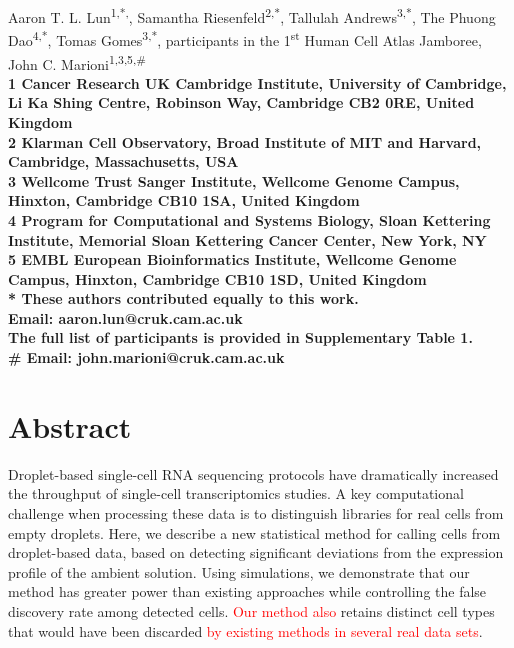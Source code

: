 \documentclass[10pt,letterpaper]{article}
\newcommand{\revised}[1]{\textcolor{red}{#1}}
\begin{document}
\vspace*{0.35in}

\begin{flushleft}
{\Large
    \textbf{}
}
\newline

Aaron T. L. Lun\textsuperscript{1,*,\dag{}},
Samantha Riesenfeld\textsuperscript{2,*},
Tallulah Andrews\textsuperscript{3,*},
The Phuong Dao\textsuperscript{4,*},
Tomas Gomes\textsuperscript{3,*},
participants in the 1\textsuperscript{st} Human Cell Atlas Jamboree\textsuperscript{\ddag{}},
John C. Marioni\textsuperscript{1,3,5,\#}
\\
\bigskip
\bf{1} Cancer Research UK Cambridge Institute, University of Cambridge, Li Ka Shing Centre, Robinson Way, Cambridge CB2 0RE, United Kingdom \\
\bf{2} Klarman Cell Observatory, Broad Institute of MIT and Harvard, Cambridge, Massachusetts, USA \\
\bf{3} Wellcome Trust Sanger Institute, Wellcome Genome Campus, Hinxton, Cambridge CB10 1SA, United Kingdom \\
\bf{4} Program for Computational and Systems Biology, Sloan Kettering Institute, Memorial Sloan Kettering Cancer Center, New York, NY \\
\bf{5} EMBL European Bioinformatics Institute, Wellcome Genome Campus, Hinxton, Cambridge CB10 1SD, United Kingdom
\\
\bigskip
* These authors contributed equally to this work.\\
\dag{} Email: aaron.lun@cruk.cam.ac.uk \\
\ddag{} The full list of participants is provided in Supplementary Table 1. \\
\# Email: john.marioni@cruk.cam.ac.uk

\end{flushleft}

\section*{Abstract}
Droplet-based single-cell RNA sequencing protocols have dramatically increased the throughput of single-cell transcriptomics studies.
A key computational challenge when processing these data is to distinguish libraries for real cells from empty droplets.
Here, we describe a new statistical method for calling cells from droplet-based data, based on detecting significant deviations from the expression profile of the ambient solution.
Using simulations, we demonstrate that our method has greater power than existing approaches while controlling the false discovery rate among detected cells.
\revised{Our method also} retains distinct cell types that would have been discarded \revised{by existing methods in several real data sets}.
\end{document}
